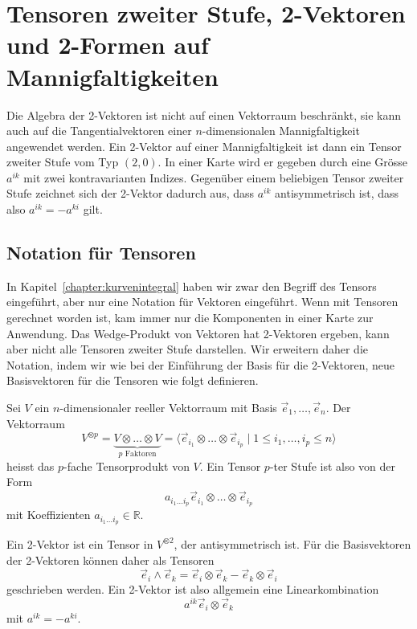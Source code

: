 %
%
\section{Tensoren zweiter Stufe, 2-Vektoren und 2-Formen auf Mannigfaltigkeiten
\label{buch:green:section:2formen}}
Die Algebra der 2-Vektoren ist nicht auf einen Vektorraum beschränkt,
sie kann auch auf die Tangentialvektoren einer $n$-dimensionalen
Mannigfaltigkeit angewendet werden.
Ein 2-Vektor auf einer Mannigfaltigkeit ist dann ein Tensor zweiter
Stufe vom Typ $(2,0)$.
In einer Karte wird er gegeben durch eine Grösse $a^{ik}$ mit zwei
kontravarianten Indizes.
Gegenüber einem beliebigen Tensor zweiter Stufe zeichnet sich der 
2-Vektor dadurch aus, dass $a^{ik}$ antisymmetrisch ist, dass also
$a^{ik}=-a^{ki}$ gilt.

%
%
\subsection{Notation für Tensoren}
In Kapitel~\ref{chapter:kurvenintegral} haben wir zwar den Begriff des
Tensors eingeführt, aber nur eine Notation für Vektoren eingeführt.
Wenn mit Tensoren gerechnet worden ist, kam immer nur die Komponenten
in einer Karte zur Anwendung.
Das Wedge-Produkt von Vektoren hat 2-Vektoren ergeben, kann aber
nicht alle Tensoren zweiter Stufe darstellen.
Wir erweitern daher die Notation, indem wir wie bei der Einführung der
Basis für die 2-Vektoren, neue Basisvektoren für die Tensoren wie 
folgt definieren.

\begin{definition}
\label{buch:green:tensoren:definition:tensorprodukt}
Sei $V$ ein $n$-dimensionaler reeller Vektorraum mit Basis
$\vec{e}_1,\dots,\vec{e}_n$.
Der Vektorraum
\[
V^{\otimes p}
=
\underbrace{
V\otimes\dots\otimes V
}_{\displaystyle \text{$p$ Faktoren}}
=
\langle \vec{e}_{i_1}\otimes\dots\otimes \vec{e}_{i_p}
\mid
1\le 
i_1,\dots,i_p
\le n
\rangle
\]
heisst das $p$-fache Tensorprodukt von $V$.
%
Ein Tensor $p$-ter Stufe ist also von der Form
\[
a_{i_1\dots i_p}\vec{e}_{i_1}\otimes\dots\otimes\vec{e}_{i_p}
\]
mit Koeffizienten $a_{i_1\dots i_p}\in\mathbb{R}$.
\end{definition}

Ein 2-Vektor ist ein Tensor in $V^{\otimes 2}$, der antisymmetrisch ist.
Für die Basisvektoren der 2-Vektoren können daher als Tensoren
\[
\vec{e}_i\wedge\vec{e}_k
=
\vec{e}_i\otimes\vec{e}_k
-
\vec{e}_k\otimes\vec{e}_i
\]
geschrieben werden.
Ein 2-Vektor ist also allgemein eine Linearkombination
\begin{equation}
a^{ik}\vec{e}_i\otimes\vec{e}_k
\label{buch:green:tensoren:eqn:2tensor}
\end{equation}
mit $a^{ik}=-a^{ki}$.

